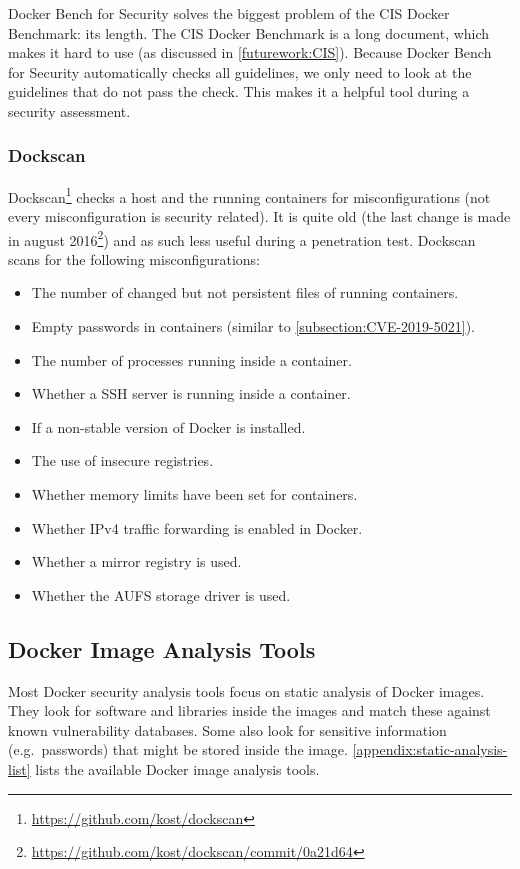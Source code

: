 \medskip

Docker Bench for Security solves the biggest problem of the CIS Docker Benchmark: its length. The CIS Docker Benchmark is a long document, which makes it hard to use (as discussed in \autoref{futurework:CIS}). Because Docker Bench for Security automatically checks all guidelines, we only need to look at the guidelines that do not pass the check. This makes it a helpful tool during a security assessment.

\subsubsection{Dockscan}
Dockscan\footnote{\url{https://github.com/kost/dockscan}} checks a host and the running containers for misconfigurations (not every misconfiguration is security related). It is quite old (the last change is made in august 2016\footnote{\url{https://github.com/kost/dockscan/commit/0a21d64}}) and as such less useful during a penetration test. Dockscan scans for the following misconfigurations:
\begin{itemize}
    \item The number of changed but not persistent files of running containers.
    \item Empty passwords in containers (similar to \autoref{subsection:CVE-2019-5021}).
    \item The number of processes running inside a container.
    \item Whether a SSH server is running inside a container.
    \item If a non-stable version of Docker is installed.
    \item The use of insecure registries.
    \item Whether memory limits have been set for containers.
    \item Whether IPv4 traffic forwarding is enabled in Docker.
    \item Whether a mirror registry is used.
    \item Whether the AUFS storage driver is used.
\end{itemize}

\subsection{Docker Image Analysis Tools}\label{subsection:image-analysis-tools}
Most Docker security analysis tools focus on static analysis of Docker images. They look for software and libraries inside the images and match these against known vulnerability databases. Some also look for sensitive information (e.g.\ passwords) that might be stored inside the image. \autoref{appendix:static-analysis-list} lists the available Docker image analysis tools.

